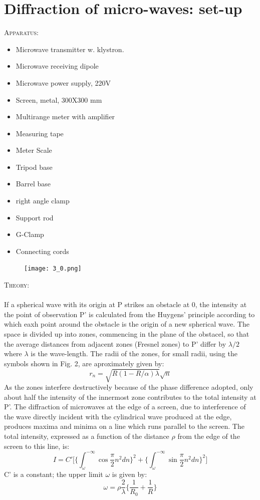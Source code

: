 \documentclass[12pt]{report}
\begin{document}
\section{Diffraction of micro-waves: set-up}
\textsc{\large{Apparatus: }}
\begin{itemize}
	\item Microwave transmitter w. klystron.
	\item Microwave receiving dipole
	\item Microwave power supply, 220V
	\item Screen, metal, 300X300 mm
	\item Multirange meter with amplifier
	\item Measuring tape
	\item Meter Scale
	\item Tripod base
	\item Barrel base
	\item right angle clamp
	\item Support rod
	\item G-Clamp
	\item Connecting cords
	\end{itemize}
\begin{figure}[h!]
	\centering
	\texttt{[image: 3\_0.png]}
\end{figure}
\textsc{\large{Theory:}}
\\
\\
If a spherical wave with its origin at P strikes an obstacle at 0, the intensity at the point of observation P’ is calculated from the Huygens’ principle according to which eaxh point around the obstacle is the origin of a new spherical wave. The space is divided up into zones, commencing in the plane of the obstacel, so that the average distances from adjacent zones (Fresnel zones) to P’ differ by $ \lambda/2 $ where $ \lambda $ is the wave-length. The radii of the zones, for small radii, using the symbols shown in Fig. 2, are aproximately given by:
$$ r_n = \sqrt{R(1-R/\alpha)\lambda}\sqrt{n} $$
As the zones interfere destructively because of the phase difference adopted, only about half the intensity of the innermost zone contributes to the total intensity at P’.
The diffraction of microwaves at the edge of a screen, due to interference of the wave directly incident with the cylindrical wave produced at the edge, produces maxima and minima on a line which runs parallel to the screen. The total intensity, expressed as a function of the distance $\rho$ from the edge of the screen to this line, is:
$$ I = C'\Big[\{\int_{\omega}^{-\infty}\cos{\frac{\pi}{2}n^2}dn\}^2 + \{\int_{\omega}^{-\infty}\sin{\frac{\pi}{2}n^2}dn\}^2\Big] $$
C' is a constant; the upper limit $\omega$ is given by:
$$ \omega = \rho \frac{2}{\lambda}\Big\{\frac{1}{R_0} + \frac{1}{R}\Big\} $$
\end{document}
